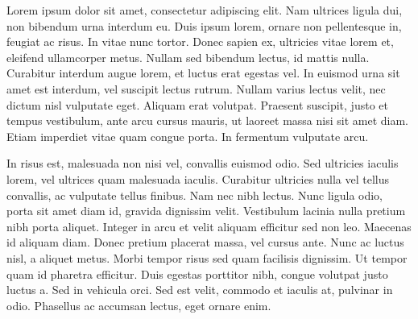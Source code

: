 Lorem ipsum dolor sit amet, consectetur adipiscing elit. Nam ultrices ligula dui, non bibendum urna interdum eu. Duis ipsum lorem, ornare non pellentesque in, feugiat ac risus. In vitae nunc tortor. Donec sapien ex, ultricies vitae lorem et, eleifend ullamcorper metus. Nullam sed bibendum lectus, id mattis nulla. Curabitur interdum augue lorem, et luctus erat egestas vel. In euismod urna sit amet est interdum, vel suscipit lectus rutrum. Nullam varius lectus velit, nec dictum nisl vulputate eget. Aliquam erat volutpat. Praesent suscipit, justo et tempus vestibulum, ante arcu cursus mauris, ut laoreet massa nisi sit amet diam. Etiam imperdiet vitae quam congue porta. In fermentum vulputate arcu.\medskip

In risus est, malesuada non nisi vel, convallis euismod odio. Sed ultricies iaculis lorem, vel ultrices quam malesuada iaculis. Curabitur ultricies nulla vel tellus convallis, ac vulputate tellus finibus. Nam nec nibh lectus. Nunc ligula odio, porta sit amet diam id, gravida dignissim velit. Vestibulum lacinia nulla pretium nibh porta aliquet. Integer in arcu et velit aliquam efficitur sed non leo. Maecenas id aliquam diam. Donec pretium placerat massa, vel cursus ante. Nunc ac luctus nisl, a aliquet metus. Morbi tempor risus sed quam facilisis dignissim. Ut tempor quam id pharetra efficitur. Duis egestas porttitor nibh, congue volutpat justo luctus a. Sed in vehicula orci. Sed est velit, commodo et iaculis at, pulvinar in odio. Phasellus ac accumsan lectus, eget ornare enim.